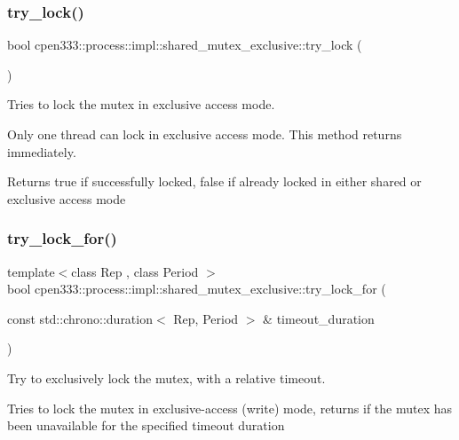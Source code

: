 \subsubsection{\texorpdfstring{try\+\_\+lock()}{try\_lock()}}
{\footnotesize\ttfamily bool cpen333\+::process\+::impl\+::shared\+\_\+mutex\+\_\+exclusive\+::try\+\_\+lock (\begin{DoxyParamCaption}{ }\end{DoxyParamCaption})\hspace{0.3cm}{\ttfamily [inline]}}



Tries to lock the mutex in exclusive access mode. 

Only one thread can lock in exclusive access mode. This method returns immediately.

\begin{DoxyReturn}{Returns}
true if successfully locked, false if already locked in either shared or exclusive access mode 
\end{DoxyReturn}
\mbox{\label{classcpen333_1_1process_1_1impl_1_1shared__mutex__exclusive_a6f74ff596d66d4ac6b8e7793b8dca78d}} 
\subsubsection{\texorpdfstring{try\+\_\+lock\+\_\+for()}{try\_lock\_for()}}
{\footnotesize\ttfamily template$<$class Rep , class Period $>$ \\
bool cpen333\+::process\+::impl\+::shared\+\_\+mutex\+\_\+exclusive\+::try\+\_\+lock\+\_\+for (\begin{DoxyParamCaption}\item[{const std\+::chrono\+::duration$<$ Rep, Period $>$ \&}]{timeout\+\_\+duration }\end{DoxyParamCaption})\hspace{0.3cm}{\ttfamily [inline]}}



Try to exclusively lock the mutex, with a relative timeout. 

Tries to lock the mutex in exclusive-\/access (write) mode, returns if the mutex has been unavailable for the specified timeout duration


